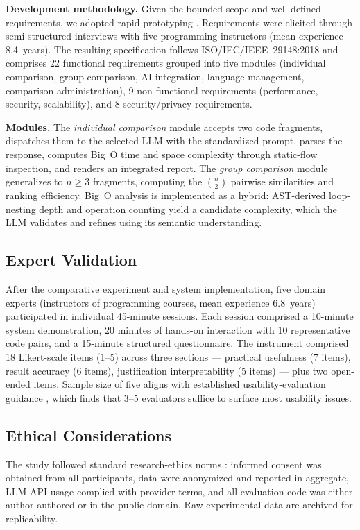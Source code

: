 \documentclass[twocolumn,11pt]{article}
\begin{document}
    \textbf{Development methodology.} Given the bounded scope and well-defined requirements, we adopted rapid prototyping \citep{tripp1990rapid,chang2025automatic}. Requirements were elicited through semi-structured interviews with five programming instructors (mean experience 8.4~years). The resulting specification follows ISO/IEC/IEEE~29148:2018 \citep{iso29148} and comprises 22 functional requirements grouped into five modules (individual comparison, group comparison, AI integration, language management, comparison administration), 9 non-functional requirements (performance, security, scalability), and 8 security/privacy requirements.
     
    \textbf{Modules.} The \emph{individual comparison} module accepts two code fragments, dispatches them to the selected LLM with the standardized prompt, parses the response, computes Big~O time and space complexity through static-flow inspection, and renders an integrated report. The \emph{group comparison} module generalizes to $n \geq 3$ fragments, computing the $\binom{n}{2}$ pairwise similarities and ranking efficiency. Big~O analysis is implemented as a hybrid: AST-derived loop-nesting depth and operation counting yield a candidate complexity, which the LLM validates and refines using its semantic understanding.
    \subsection{Expert Validation}
    After the comparative experiment and system implementation, five domain experts (instructors of programming courses, mean experience 6.8~years) participated in individual 45-minute sessions. Each session comprised a 10-minute system demonstration, 20 minutes of hands-on interaction with 10 representative code pairs, and a 15-minute structured questionnaire. The instrument comprised 18 Likert-scale items (1--5) across three sections --- practical usefulness (7 items), result accuracy (6 items), justification interpretability (5 items) --- plus two open-ended items. Sample size of five aligns with established usability-evaluation guidance \citep{kusmaryono2022number}, which finds that 3--5 evaluators suffice to surface most usability issues.
    \subsection{Ethical Considerations}
    The study followed standard research-ethics norms \citep{rodrigues2023ethical,resnik2024ethics}: informed consent was obtained from all participants, data were anonymized and reported in aggregate, LLM API usage complied with provider terms, and all evaluation code was either author-authored or in the public domain. Raw experimental data are archived for replicability.
\end{document}
